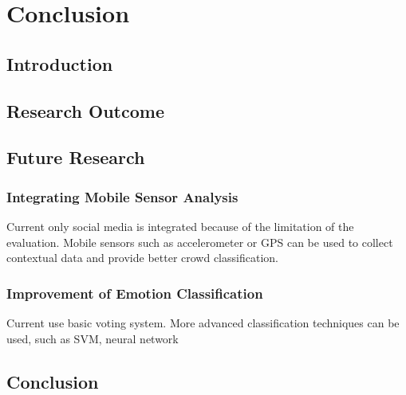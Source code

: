 \chapter{Conclusion}

\ifpdf
    \graphicspath{{Chapter6/Figs/Raster/}{Chapter6/Figs/PDF/}{Chapter6/Figs/}}
\else
    \graphicspath{{Chapter6/Figs/Vector/}{Chapter6/Figs/}}
\fi

\section{Introduction}
\section{Research Outcome}
\section{Future Research}
\subsection{Integrating Mobile Sensor Analysis}
Current only social media is integrated because of the limitation of the evaluation. Mobile sensors such as accelerometer or GPS can be used to collect contextual data and provide better crowd classification.

\subsection{Improvement of Emotion Classification}
Current use basic voting system. More advanced classification techniques can be used, such as SVM, neural network
\section{Conclusion}